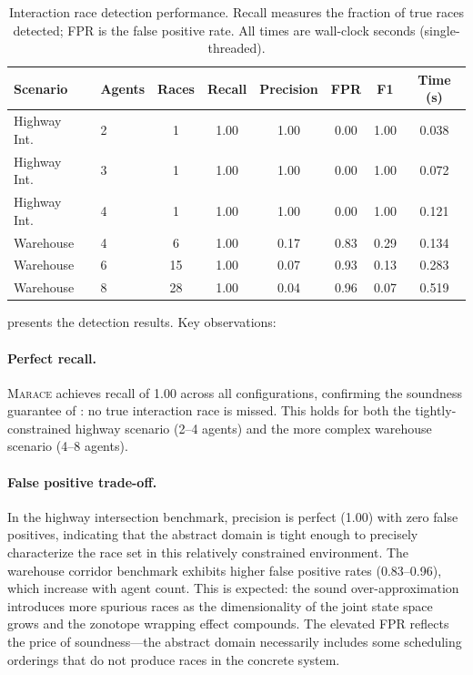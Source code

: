 \documentclass[11pt]{article}
\newcommand{\marace}{\textsc{Marace}}
\begin{document}
\begin{table}[t]
\centering
\caption{Interaction race detection performance. Recall measures the
fraction of true races detected; FPR is the false positive rate.
All times are wall-clock seconds (single-threaded).}
\label{tab:detection}
\begin{tabular}{@{}llcccccc@{}}
\toprule
\textbf{Scenario} & \textbf{Agents} & \textbf{Races} & \textbf{Recall} & \textbf{Precision} & \textbf{FPR} & \textbf{F1} & \textbf{Time (s)} \\
\midrule
Highway Int.\ & 2 & 1 & 1.00 & 1.00 & 0.00 & 1.00 & 0.038 \\
Highway Int.\ & 3 & 1 & 1.00 & 1.00 & 0.00 & 1.00 & 0.072 \\
Highway Int.\ & 4 & 1 & 1.00 & 1.00 & 0.00 & 1.00 & 0.121 \\
\midrule
Warehouse & 4 & 6 & 1.00 & 0.17 & 0.83 & 0.29 & 0.134 \\
Warehouse & 6 & 15 & 1.00 & 0.07 & 0.93 & 0.13 & 0.283 \\
Warehouse & 8 & 28 & 1.00 & 0.04 & 0.96 & 0.07 & 0.519 \\
\bottomrule
\end{tabular}
\end{table}

 presents the detection results. Key observations:

\paragraph{Perfect recall.}
\marace{} achieves recall of 1.00 across all configurations, confirming
the soundness guarantee of : no true interaction race
is missed. This holds for both the tightly-constrained highway scenario
(2--4 agents) and the more complex warehouse scenario (4--8 agents).

\paragraph{False positive trade-off.}
In the highway intersection benchmark, precision is perfect (1.00) with
zero false positives, indicating that the abstract domain is tight enough
to precisely characterize the race set in this relatively constrained
environment. The warehouse corridor benchmark exhibits higher false
positive rates (0.83--0.96), which increase with agent count. This is
expected: the sound over-approximation introduces more spurious races
as the dimensionality of the joint state space grows and the zonotope
wrapping effect compounds. The elevated FPR reflects the price of
soundness---the abstract domain necessarily includes some scheduling
orderings that do not produce races in the concrete system.
\end{document}
